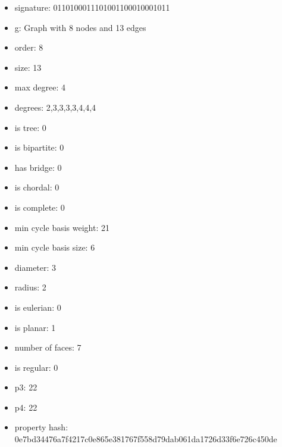 \begin{itemize}
\item signature: 0110100011101001100010001011
\item g: Graph with 8 nodes and 13 edges
\item order: 8
\item size: 13
\item max degree: 4
\item degrees: 2,3,3,3,3,4,4,4
\item is tree: 0
\item is bipartite: 0
\item has bridge: 0
\item is chordal: 0
\item is complete: 0
\item min cycle basis weight: 21
\item min cycle basis size: 6
\item diameter: 3
\item radius: 2
\item is eulerian: 0
\item is planar: 1
\item number of faces: 7
\item is regular: 0
\item p3: 22
\item p4: 22
\item property hash: 0e7bd34476a7f4217c0e865e381767f558d79dab061da1726d33f6e726c450de
\end{itemize}
\newpage
\begin{figure}
\end{figure}
